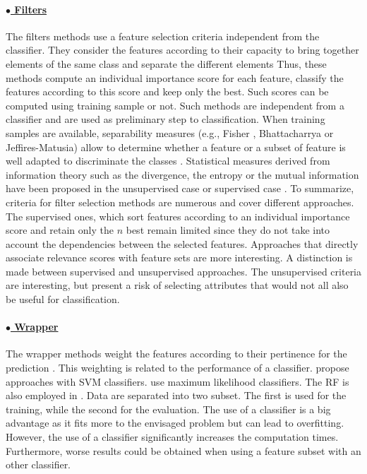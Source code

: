 \paragraph{\underline{$\bullet$ Filters} \\}
The filters methods use a feature selection criteria independent from the classifier. They consider the features according to their capacity to bring together elements of the same class and separate the different elements \citep{john1997enhancements} Thus, these methods compute an individual importance score for each feature, classify the features according to this score and keep only the best. Such scores can be computed using training sample or not. Such methods are independent from a classifier and are used as preliminary step to classification. When training samples are available, separability measures (e.g., Fisher \citep{fisher1936use}, Bhattacharrya or Jeffires-Matusia) allow to determine whether a feature or a subset of feature is well adapted to discriminate the classes \citep{bruzzone2000technique, herold2003spectral, de2005band, serpico2007extraction}. Statistical measures derived from information theory such as the divergence, the entropy or the mutual information have been proposed in the unsupervised case \citep{martinez2007clustering, le2011constrained} or supervised case \citep{battiti1994using, guo2008fast, estevez2009normalized, sotoca2010supervised, cang2012mutual}.
To summarize, criteria for filter selection methods are numerous and cover different approaches. The supervised ones, which sort features according to an individual importance score and retain only the $n$ best remain limited since they do not take into account the dependencies between the selected features. Approaches that directly associate relevance scores with feature sets are more interesting. A distinction is made between supervised and unsupervised approaches. The unsupervised criteria are interesting, but present a risk of selecting attributes that would not all also be useful for classification.

\paragraph{\underline{$\bullet$ Wrapper} \\}
The wrapper methods weight the features according to their pertinence for the prediction \citep{kohavi1997wrappers}. This weighting is related to the performance of a classifier.  \cite{estevez2009normalized, li2011effective, yang2007research, zhuo2008genetic} propose approaches with SVM classifiers. \cite{zhang2007dimensionality, fauvel2015fast} use maximum likelihood classifiers. The RF is also employed in \cite{diaz2006gene}. Data are separated into two subset. The first is used for the training, while the second for the evaluation. The use of a classifier is a big advantage as it fits more to the envisaged problem but can lead to overfitting. However, the use of a classifier significantly increases the computation times. Furthermore, worse results could be obtained when using a feature subset with an other classifier.

